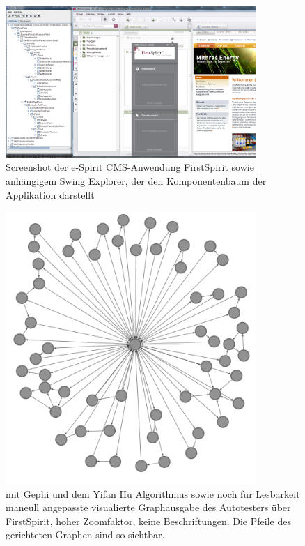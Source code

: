 \begin{figure}
	\centering
	\includegraphics[width=0.85\textwidth]{bilder/screenshot_freespirit.png}
	\caption{Screenshot der e-Spirit CMS-Anwendung FirstSpirit
	sowie anhängigem Swing Explorer, der den Komponentenbaum der Applikation darstellt}
	\label{fig:screenshot_freespirit}
\end{figure}

\begin{figure}
	\centering
	\includegraphics[width=0.85\textwidth]{bilder/model_firstspirit_notext.png}
	\caption{mit Gephi und dem Yifan Hu Algorithmus \cite{hu2005efficient}
    sowie noch für Lesbarkeit maneull angepasste visualierte Graphausgabe 
	des Autotesters über FirstSpirit, hoher Zoomfaktor, keine Beschriftungen.
	Die Pfeile des gerichteten Graphen sind so sichtbar.}
	\label{fig:model_firstspirit_notext}
\end{figure}

